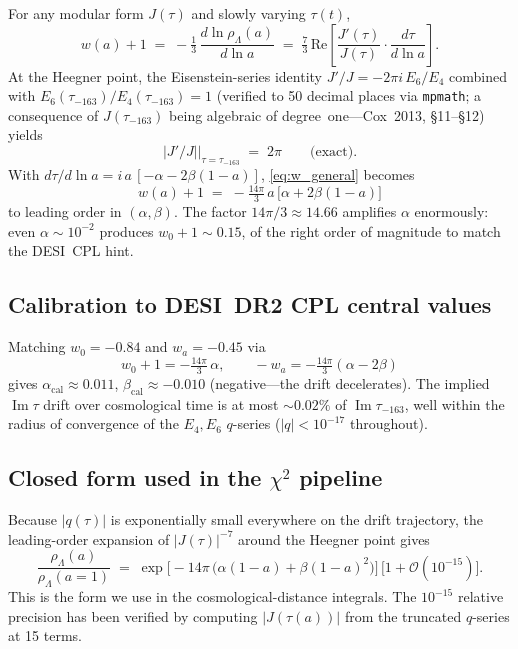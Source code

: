 \documentclass[11pt,letterpaper,twoside]{article}
\newcommand{\rL}{\rho_{\Lambda}}
\newcommand{\Heegner}{\tau_{-163}}
\begin{document}
For any modular form $J(\tau)$ and slowly varying $\tau(t)$,
\begin{equation}\label{eq:w_general}
  w(a)+1
  \;=\;-\tfrac{1}{3}\,\frac{d\ln\rL(a)}{d\ln a}
  \;=\;\tfrac{7}{3}\,\mathrm{Re}\!\left[\frac{J'(\tau)}{J(\tau)}\cdot
                                       \frac{d\tau}{d\ln a}\right].
\end{equation}
At the Heegner point, the Eisenstein-series identity
$J'/J=-2\pi i\,E_{6}/E_{4}$ combined with $E_{6}(\Heegner)/E_{4}(\Heegner)=1$
(verified to 50 decimal places via \texttt{mpmath}; a consequence of
$J(\Heegner)$ being algebraic of degree~one---Cox~2013, \S11--\S12) yields
\begin{equation}\label{eq:JpJ}
  |J'/J|\bigr|_{\tau=\Heegner}\;=\;2\pi\qquad\text{(exact).}
\end{equation}
With $d\tau/d\ln a=i\,a\,[-\alpha-2\beta(1-a)]$, \eqref{eq:w_general} becomes
\begin{equation}\label{eq:w_MQ}
  \boxed{\;w(a)+1\;=\;-\tfrac{14\pi}{3}\,a\,\bigl[\alpha+2\beta(1-a)\bigr]\;}
\end{equation}
to leading order in $(\alpha,\beta)$.
The factor $14\pi/3\approx14.66$ amplifies $\alpha$ enormously: even
$\alpha\sim10^{-2}$ produces $w_{0}+1\sim0.15$, of the right order of magnitude
to match the DESI~CPL hint.

\subsection{Calibration to DESI~DR2 CPL central values}

Matching $w_{0}=-0.84$ and $w_{a}=-0.45$ via
\begin{equation}
  w_{0}+1=-\tfrac{14\pi}{3}\,\alpha,\qquad
  -w_{a}=-\tfrac{14\pi}{3}(\alpha-2\beta)
\end{equation}
gives $\alpha_{\mathrm{cal}}\approx 0.011$, $\beta_{\mathrm{cal}}\approx-0.010$
(negative---the drift decelerates).
The implied $\operatorname{Im}\tau$ drift over cosmological time is at most
$\sim0.02\%$ of $\operatorname{Im}\Heegner$, well within the radius of
convergence of the $E_{4},E_{6}$ $q$-series ($|q|<10^{-17}$ throughout).

\subsection{Closed form used in the $\chi^{2}$ pipeline}

Because $|q(\tau)|$ is exponentially small everywhere on the drift trajectory,
the leading-order expansion of $|J(\tau)|^{-7}$ around the Heegner point gives
\begin{equation}\label{eq:rho_closed}
  \frac{\rL(a)}{\rL(a=1)}
  \;=\;\exp\!\bigl[-14\pi\,\bigl(\alpha(1-a)+\beta(1-a)^{2}\bigr)\bigr]\,
       \bigl[1+\mathcal{O}(10^{-15})\bigr].
\end{equation}
This is the form we use in the cosmological-distance integrals.
The $10^{-15}$ relative precision has been verified by computing $|J(\tau(a))|$
from the truncated $q$-series at 15 terms.
\end{document}
